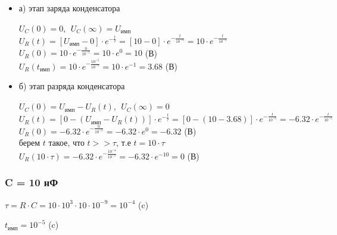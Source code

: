 \begin{itemize}
\item[] а) этап заряда конденсатора

		$U_C(0)	= 0,\ \ U_C(\infty) = U_\text{имп}$\\
		$U_R(t) = [U_\text{имп} - 0] \cdot e^{-\frac{t}{\tau}} = [10 - 0] \cdot e^{-\frac{t}{10^{-5}}} = 10 \cdot e^{-\frac{t}{10^{-5}}}$\\
		$U_R(0) = 10 \cdot e^{-\frac{0}{10^{-5}}} = 10 \cdot e^0 = 10$ (В)\\
		$U_R(t_\text{имп}) = 10 \cdot e^{-\frac{10^{-5}}{10^{-5}}} = 10 \cdot e^{-1} = 3.68$ (В)\\

\item[] б) этап разряда конденсатора

		$U_C(0)	= U_\text{имп} - U_R(t),\ \ U_C(\infty) = 0$\\
		$U_R(t) = [0 - (U_\text{имп} - U_R(t))] \cdot e^{-\frac{t}{\tau}} = [0 - (10 - 3.68)] \cdot e^{-\frac{t}{10^{-5}}} = -6.32 \cdot e^{-\frac{t}{10^{-5}}}$\\
		$U_R(0) = -6.32 \cdot e^{-\frac{0}{10^{-5}}} = -6.32 \cdot e^0 = -6.32$ (В)\\
		берем $t$ такое, что $t >> \tau$, т.е $t = 10 \cdot \tau$ \\
		$U_R(10 \cdot \tau)	= -6.32 \cdot e^{-\frac{10^{-4}}{10^{-5}}} = -6.32 \cdot e^{-10} = 0$ (В)\\
		
\end{itemize}

\subsubsection{C = 10 нФ}

		$\tau = R \cdot C = 10 \cdot 10^3 \cdot 10 \cdot 10^{-9} = 10^{-4}$ (c)
		
		$t_\text{имп} = 10^{-5}$ (c)

